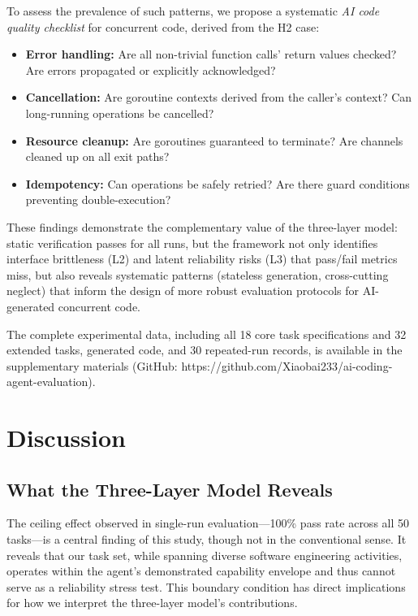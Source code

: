 \documentclass[conference]{IEEEtran}
\begin{document}
To assess the prevalence of such patterns, we propose a systematic \emph{AI code quality checklist} for concurrent code, derived from the H2 case:

\begin{itemize}
  \item \textbf{Error handling:} Are all non-trivial function calls' return values checked? Are errors propagated or explicitly acknowledged?
  \item \textbf{Cancellation:} Are goroutine contexts derived from the caller's context? Can long-running operations be cancelled?
  \item \textbf{Resource cleanup:} Are goroutines guaranteed to terminate? Are channels cleaned up on all exit paths?
  \item \textbf{Idempotency:} Can operations be safely retried? Are there guard conditions preventing double-execution?
\end{itemize}

These findings demonstrate the complementary value of the three-layer model: static verification passes for all runs, but the framework not only identifies interface brittleness (L2) and latent reliability risks (L3) that pass/fail metrics miss, but also reveals systematic patterns (stateless generation, cross-cutting neglect) that inform the design of more robust evaluation protocols for AI-generated concurrent code.

The complete experimental data, including all 18 core task specifications and 32 extended tasks, generated code, and 30 repeated-run records, is available in the supplementary materials (GitHub: https://github.com/Xiaobai233/ai-coding-agent-evaluation).

\section{Discussion}
\label{sec:discussion}

\subsection{What the Three-Layer Model Reveals}

The ceiling effect observed in single-run evaluation---100\% pass rate across all 50 tasks---is a central finding of this study, though not in the conventional sense. It reveals that our task set, while spanning diverse software engineering activities, operates within the agent's demonstrated capability envelope and thus cannot serve as a reliability stress test. This boundary condition has direct implications for how we interpret the three-layer model's contributions.
\end{document}
